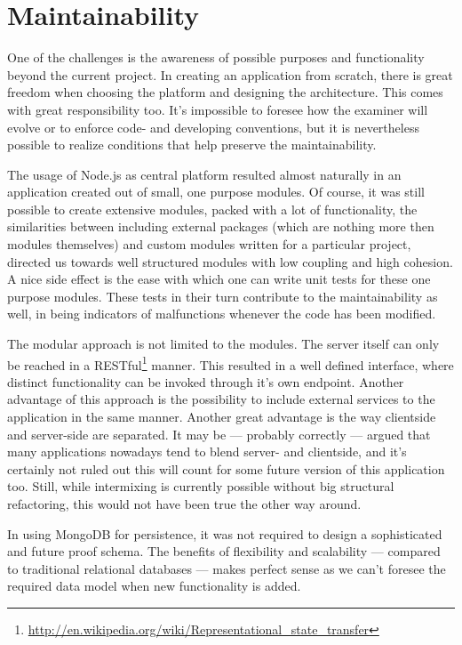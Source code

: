 \section{Maintainability}
One of the challenges is the awareness of possible purposes
and functionality beyond the current project. In creating an application from
scratch, there is great freedom when choosing the platform and designing the
architecture. This comes with great responsibility too. It's impossible to
foresee how the \gls{examiner} will evolve or to enforce code- and developing 
conventions, but it is nevertheless possible to realize
conditions that help preserve the maintainability.

The usage of Node.js as central platform resulted almost naturally in an application 
created out of small, one purpose modules. Of course, it was still possible to create
extensive modules, packed with a lot of functionality, the similarities  
between including external packages (which are nothing more then modules themselves) 
and custom modules written for a particular project, directed us towards
well structured modules with low coupling and high cohesion. A nice side effect
is the ease with which one can write unit tests for these one purpose modules. These tests
in their turn contribute to the maintainability as well, in being indicators of 
malfunctions whenever the code has been modified. 

The modular approach is not limited to the modules. The server itself can only
be reached in a
RESTful\footnote{\url{http://en.wikipedia.org/wiki/Representational_state_transfer}}
manner. This resulted in a well defined interface, where
distinct functionality can be invoked through it's own endpoint. Another
advantage of this approach is the possibility to include external 
services to the application in the same manner. Another great advantage is the
way clientside and server-side are separated. It may be --- probably 
correctly ---
argued that many applications nowadays tend to blend server- and clientside, and
it's certainly not ruled out this will count for some future version of this
application too. Still, while intermixing is currently possible without
big structural refactoring, this would not have been true the other way around.

In using MongoDB for persistence, it was not required to design a sophisticated
and future proof schema. The benefits of flexibility and scalability 
--- compared to traditional relational databases ---
makes  perfect sense as we can't foresee the required data model when new 
functionality is added.

